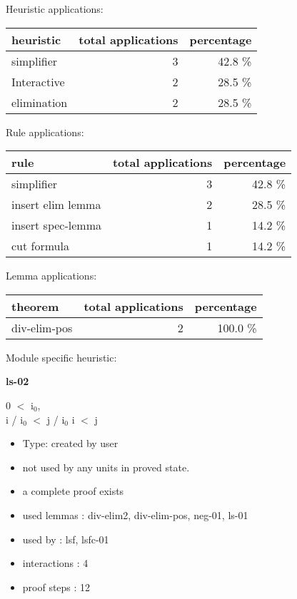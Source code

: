 \documentclass[a4paper]{article}
\begin{document}
\medskip


Heuristic applications:

\begin{supertabular}{l|r|r}
heuristic	& total applications & percentage \\ \hline
simplifier & 3 & 42.8 \% \\
Interactive & 2 & 28.5 \% \\
elimination & 2 & 28.5 \% \\

\end{supertabular}

Rule applications:

\begin{supertabular}{l|r|r}
rule	        & total applications & percentage \\ \hline
simplifier & 3 & 42.8 \% \\
insert elim lemma & 2 & 28.5 \% \\
insert spec-lemma & 1 & 14.2 \% \\
cut formula & 1 & 14.2 \% \\

\end{supertabular}

Lemma applications:

\begin{supertabular}{l|r|r}
theorem	        & total applications & percentage \\ \hline
div-elim-pos & 2 & 100.0 \% \\

\end{supertabular}

Module specific heuristic:

\pagebreak

{\LARGE\bf ls-02}\label{lemma-ls-02}

\medskip

0 $<$ $\mbox{i}_{0}$, \\
i / $\mbox{i}_{0}$ $<$ j / $\mbox{i}_{0}$ \Fol i $<$ j

\begin{itemize}

\item Type: created by user

\item not used by any units in proved state.
\item       a complete proof exists
\item       used lemmas  : div-elim2, div-elim-pos, neg-01, ls-01
\item       used by      : lsf, lsfc-01
\item       interactions : 4
\item       proof steps  : 12
\end{itemize}
\end{document}
